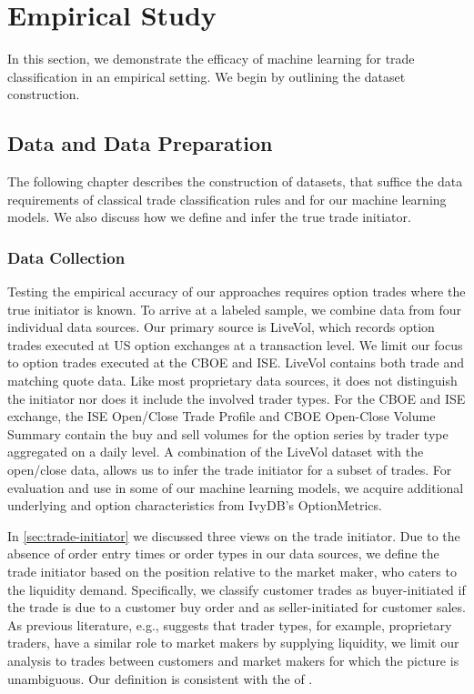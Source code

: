 \section{Empirical Study}\label{sec:empirical-study}

In this section, we demonstrate the efficacy of machine learning for trade classification in an empirical setting. We begin by outlining the dataset construction.

\subsection{Data and Data Preparation}\label{sec:data-and-data-preparation}

The following chapter describes the construction of datasets, that suffice the data requirements of classical trade classification rules and for our machine learning models. We also discuss how we define and infer the true trade initiator.

\subsubsection{Data Collection}\label{sec:data-collection}


Testing the empirical accuracy of our approaches requires option trades where the true initiator is known. To arrive at a labeled sample, we combine data from four individual data sources. Our primary source is LiveVol, which records option trades executed at US option exchanges at a transaction level. We limit our focus to option trades executed at the \gls{CBOE} and \gls{ISE}. LiveVol contains both trade and matching quote data. Like most proprietary data sources, it does not distinguish the initiator nor does it include the involved trader types. For the \gls{CBOE} and \gls{ISE} exchange, the \gls{ISE} Open/Close Trade Profile and \gls{CBOE} Open-Close Volume Summary contain the buy and sell volumes for the option series by trader type aggregated on a daily level. A combination of the LiveVol dataset with the open/close data, allows us to infer the trade initiator for a subset of trades. For evaluation and use in some of our machine learning models, we acquire additional underlying and option characteristics from IvyDB's OptionMetrics.

In \cref{sec:trade-initiator} we discussed three views on the trade initiator. Due to the absence of order entry times or order types in our data sources, we define the trade initiator based on the position relative to the market maker, who caters to the liquidity demand. Specifically, we classify customer trades as buyer-initiated if the trade is due to a customer buy order and as seller-initiated for customer sales. As previous literature, e.g., \textcite[][4276]{garleanuDemandBasedOptionPricing2009} suggests that trader types, for example, proprietary traders, have a similar role to market makers by supplying liquidity, we limit our analysis to trades between customers and market makers for which the picture is unambiguous. Our definition is consistent with the of \textcite[][8]{grauerOptionTradeClassification2022}.


